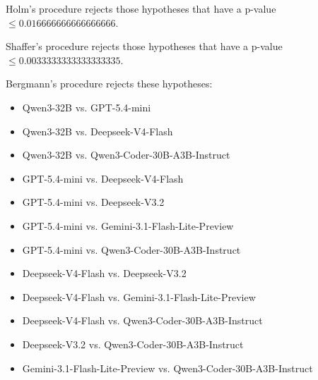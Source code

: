 \documentclass[a4paper,10pt]{article}
\begin{document}
\begin{landscape}
Holm's procedure rejects those hypotheses that have a p-value $\le0.016666666666666666$.


Shaffer's procedure rejects those hypotheses that have a p-value $\le0.0033333333333333335$.


Bergmann's procedure rejects these hypotheses:


\begin{itemize}


\item Qwen3-32B vs. GPT-5.4-mini\item Qwen3-32B vs. Deepseek-V4-Flash\item Qwen3-32B vs. Qwen3-Coder-30B-A3B-Instruct\item GPT-5.4-mini vs. Deepseek-V4-Flash\item GPT-5.4-mini vs. Deepseek-V3.2\item GPT-5.4-mini vs. Gemini-3.1-Flash-Lite-Preview\item GPT-5.4-mini vs. Qwen3-Coder-30B-A3B-Instruct\item Deepseek-V4-Flash vs. Deepseek-V3.2\item Deepseek-V4-Flash vs. Gemini-3.1-Flash-Lite-Preview\item Deepseek-V4-Flash vs. Qwen3-Coder-30B-A3B-Instruct\item Deepseek-V3.2 vs. Qwen3-Coder-30B-A3B-Instruct\item Gemini-3.1-Flash-Lite-Preview vs. Qwen3-Coder-30B-A3B-Instruct\end{itemize}



\end{landscape}
\end{document}
